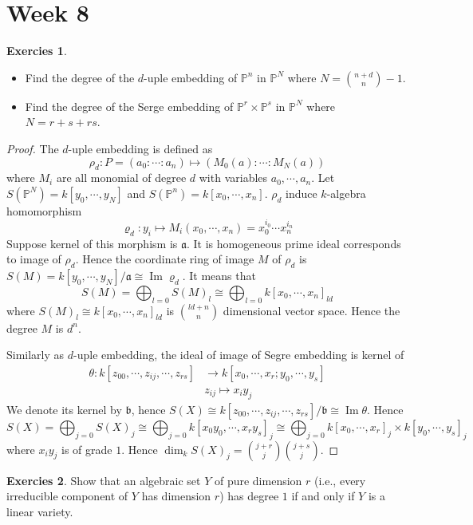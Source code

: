 \documentclass[12pt,a4paper]{article}
\theoremstyle{definition}
\newtheorem{exer}{Exercies}[section]
\DeclareMathOperator{\im}{Im}
\begin{document}
\section{Week 8}
\begin{exer}
	\begin{itemize}
		\item Find the degree of the $d$-uple embedding of $\mathbb{P}^n$ in $\mathbb{P}^N$ where $N = \binom{n+d}{n}-1$.
		\item Find the degree of the Serge embedding of $\mathbb{P}^r \times \mathbb{P}^s$ in $\mathbb{P}^N$ where $N= r+s +rs$.
	\end{itemize}
\end{exer}
\begin{proof}
	The $d$-uple embedding is defined as
	\[
	\rho_d \colon P=(a_0 : \cdots: a_n) \mapsto (M_0(a): \cdots : M_N(a))
	\]
	where $M_i$ are all monomial of degree $d$ with variables $a_0, \cdots ,a_n$. Let $S(\mathbb{P}^N) = k[y_0, \cdots, y_N]$ and $S(\mathbb{P}^n)=k[x_0,\cdots,x_n]$. $\rho_d$ induce $k$-algebra homomorphism
	\[
	\varrho_d \colon y_i \mapsto M_i(x_0, \cdots, x_n)=x_0^{i_0} \cdots x_n^{i_n}
	\]
	Suppose kernel of this morphism is $\mathfrak{a}$. It is homogeneous prime ideal corresponds to image of $\rho_d$. Hence the coordinate ring of image $M$ of $\rho_d$ is $S(M)= k[y_0, \cdots, y_N]/\mathfrak{a} \cong \im \varrho_d$. It means that 
	\[
	S(M) = \bigoplus_{l=0}S(M)_l\cong \bigoplus_{l=0} k[x_0, \cdots, x_n]_{ld}
	\]
	where $S(M)_l \cong k[x_0, \cdots, x_n]_{ld}$ is $\binom{ld+n}{n}$ dimensional vector space. Hence the degree $M$ is $d^n$.
	
	Similarly as $d$-uple embedding, the ideal of image of Segre embedding is kernel of 
	\[
	 \begin{aligned}
	 \theta \colon k[z_{00}, \cdots, z_{ij}, \cdots, z_{rs}] &\to k[x_0, \cdots, x_r; y_0, \cdots, y_s]\\
	 &z_{ij} \mapsto x_i y_j
	 \end{aligned}
	\]
	We denote its kernel by $\mathfrak{b}$, hence $S(X)\cong k[z_{00}, \cdots, z_{ij}, \cdots, z_{rs}]/\mathfrak{b} \cong \im \theta$. Hence \[
	S(X) = \bigoplus_{j=0} S(X)_j \cong \bigoplus_{j=0} k[x_0y_0, \cdots, x_r y_s]_{j} \cong \bigoplus_{j=0} k[x_0, \cdots, x_r]_j \times k[y_0, \cdots, y_s]_j
	\]
	where $x_iy_j$ is of grade $1$. Hence $\dim_k S(X)_j = \binom{j+r}{j} \binom{j+s}{j}$. 
\end{proof}
\begin{exer}
	Show that an algebraic set $Y$ of pure dimension $r$ (i.e., every irreducible component of $Y$ has dimension $r$) has degree $1$ if and only if $Y$ is a linear variety.
\end{exer}
\end{document}
